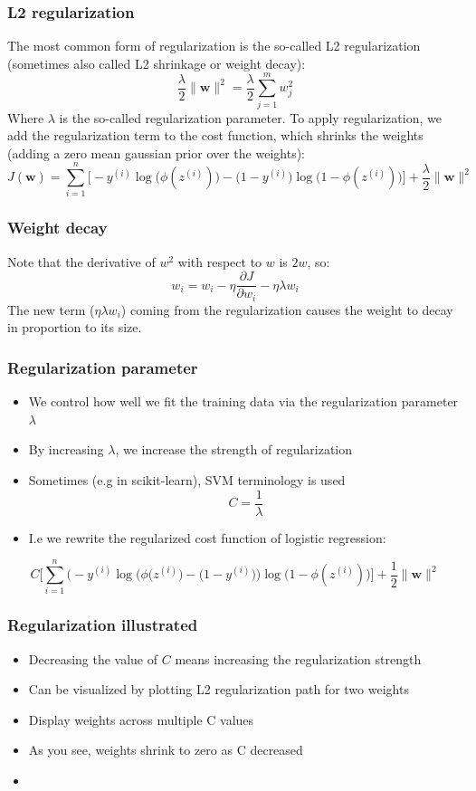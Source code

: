 \documentclass{beamer}
\begin{document}
\begin{frame}
  \frametitle{L2 regularization}
  The most common form of regularization is the so-called L2 regularization (sometimes also called L2 shrinkage or weight decay):
  \[
  \frac{\lambda}{2} \lVert \mathbf{w} \rVert^2 = \frac{\lambda}{2} \sum_{j=1}^m w_{j}^{2}
  \]
  Where $\lambda$ is the so-called regularization parameter.
  To apply regularization, we add the regularization term to the cost function, which shrinks the weights (adding a zero mean gaussian prior over the weights):
  \[
  J(\mathbf{w}) = \sum_{i=1}^{n} \bigg[ - y^{(i)} \log \big(  \phi(z^{(i)})  \big)  - \big( 1 - y ^{(i)} \big)  \log \big( 1 - \phi(z^{(i)})   \big)   \bigg] + \frac{\lambda}{2} \lVert \mathbf{w}\rVert^2
  \]
\end{frame}

\begin{frame}
  \frametitle{Weight decay}
  Note that the derivative of $w^2$ with respect to $w$ is $2w$, so:
  \[
  w_i = w_i - \eta \frac{\partial J}{\partial w_i} - \eta \lambda w_i
  \]
  The new term ($\eta \lambda w_i$) coming from the regularization causes the weight to decay in proportion to its size.
\end{frame}

\begin{frame}
  \frametitle{Regularization parameter}
  \begin{itemize}
  \item We control how well we fit the training data via the regularization parameter $\lambda$
  \item By increasing $\lambda$, we increase the strength of regularization
  \item Sometimes (e.g in scikit-learn), SVM terminology is used
    \[
    C = \frac{1}{\lambda}
    \]
  \item I.e we rewrite the regularized cost function of logistic regression:
  \end{itemize}
  \[
  C \Bigg[  \sum_{i=1}^{n} \Big(   -y^{(i)} \log \big( \phi(z^{(i)} \big) - \big(  1 - y^{(i)} \big)    \Big) \log \bigg( 1 - \phi(z^{(i)}) \bigg)         \Bigg] + \frac{1}{2} \lVert \mathbf{w} \rVert^2
  \]
\end{frame}

\begin{frame}
  \frametitle{Regularization illustrated}
  \begin{itemize}
  \item Decreasing the value of $C$ means increasing the regularization strength
  \item Can be visualized by plotting L2 regularization path for two weights
  \item Display weights across multiple C values
  \item As you see, weights shrink to zero as C decreased
  \item \href{https://github.com/rasbt/python-machine-learning-book/blob/master/code/ch03/ch03.ipynb}{}
  \end{itemize}
\end{frame}
\end{document}
